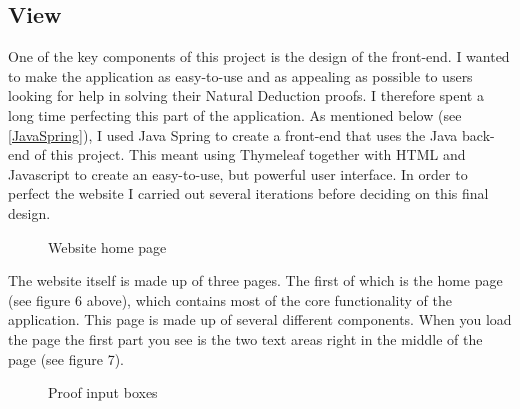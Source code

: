 \pagebreak
\subsection{View \label{view}}

One of the key components of this project is the design of the front-end. I wanted to make the application as easy-to-use and as appealing as possible to users looking for help in solving their Natural Deduction proofs. I therefore spent a long time perfecting this part of the application. As mentioned below (see \ref{JavaSpring}), I used Java Spring to create a front-end that uses the Java back-end of this project. This meant using Thymeleaf together with HTML and Javascript to create an easy-to-use, but powerful user interface. In order to perfect the website I carried out several iterations before deciding on this final design.

\begin{figure}[!ht]
	\centering
	\caption{Website home page}
\end{figure}

The website itself is made up of three pages. The first of which is the home page (see figure 6 above), which contains most of the core functionality of the application. This page is made up of several different components. When you load the page the first part you see is the two text areas right in the middle of the page (see figure 7). 

\begin{figure}[!ht]
	\centering
	\caption{Proof input boxes}
\end{figure}


